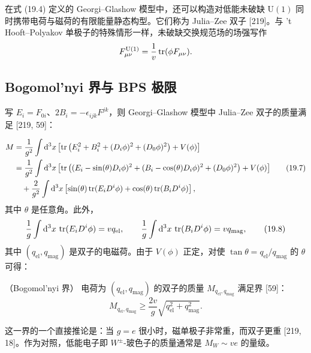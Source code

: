在式 (19.4) 定义的 Georgi--Glashow 模型中，还可以构造对低能未破缺 $\mathrm{U}(1)$ 同时携带电荷与磁荷的有限能量静态构型。它们称为 Julia--Zee 双子 [219]。与 't Hooft--Polyakov 单极子的特殊情形一样，未破缺交换规范场的场强写作
\[
F^{\mathrm{U}(1)}_{\mu\nu}=\frac{1}{v}\operatorname{tr}(\phi F_{\mu\nu}).
\]

\subsection{Bogomol'nyi 界与 BPS 极限}

写 $E_i=F_{0i}$、$2B_i=-\epsilon_{ijk}F^{jk}$，则 Georgi--Glashow 模型中 Julia--Zee 双子的质量满足 [219, 59]：


\begin{equation}
\begin{aligned}
M&=\frac{1}{g^2}\int \mathrm{d}^3x\left[\operatorname{tr}\left(E_i^2+B_i^2+(D_i\phi)^2+(D_0\phi)^2\right)+V(\phi)\right]\\
&=\frac{1}{g^2}\int \mathrm{d}^3x\left[\operatorname{tr}\left((E_i-\sin(\theta)D_i\phi)^2+(B_i-\cos(\theta)D_i\phi)^2+(D_0\phi)^2\right)+V(\phi)\right]\\
&\quad+\frac{2}{g^2}\int \mathrm{d}^3x\left[\sin(\theta)\operatorname{tr}(E_iD^i\phi)+\cos(\theta)\operatorname{tr}(B_iD^i\phi)\right],
\end{aligned} \tag{19.7}
\end{equation}
其中 $\theta$ 是任意角。此外，
\begin{equation}
\frac{1}{g}\int \mathrm{d}^3x\,\operatorname{tr}(E_iD^i\phi)=vq_{\mathrm{el}},
\qquad
\frac{1}{g}\int \mathrm{d}^3x\,\operatorname{tr}(B_iD^i\phi)=vq_{\mathrm{mag}}, \tag{19.8}
\end{equation}
其中 $(q_{\mathrm{el}},q_{\mathrm{mag}})$ 是双子的电磁荷。由于 $V(\phi)$ 正定，对使 $\tan\theta=q_{\mathrm{el}}/q_{\mathrm{mag}}$ 的 $\theta$ 可得：

\begin{proposition}[19.10]（Bogomol'nyi 界）
电荷为 $(q_{\mathrm{el}},q_{\mathrm{mag}})$ 的双子的质量 $M_{q_{\mathrm{el}},q_{\mathrm{mag}}}$ 满足界 [59]：
\begin{equation}
M_{q_{\mathrm{el}},q_{\mathrm{mag}}}\ge \frac{2v}{g}\sqrt{q_{\mathrm{el}}^2+q_{\mathrm{mag}}^2}. \tag{19.9}
\end{equation}
\end{proposition}

这一界的一个直接推论是：当 $g=e$ 很小时，磁单极子非常重，而双子更重 [219, 18]。作为对照，低能电子即 $W^\pm$-玻色子的质量通常是 $M_W\sim ve$ 的量级。

